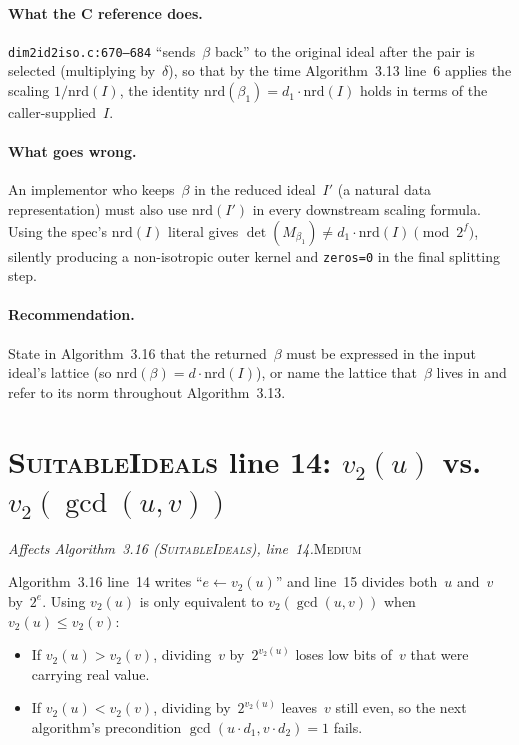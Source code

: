 \documentclass[a4paper,11pt]{article}
\newcommand{\algo}[1]{Algorithm~#1}
\newcommand{\medium}{\textsc{\color{RoyalBlue}Medium}}
\newcommand{\finding}[2]{\noindent\textit{#1}\hfill#2\par\smallskip}
\begin{document}
\paragraph{What the C reference does.}
\texttt{dim2id2iso.c:670--684} ``sends~$\beta$ back'' to the
original ideal after the pair is selected (multiplying
by~$\delta$), so that by the time \algo{3.13} line~6 applies the
scaling $1/\mathrm{nrd}(I)$, the identity
$\mathrm{nrd}(\beta_1) = d_1 \cdot \mathrm{nrd}(I)$ holds in
terms of the caller-supplied~$I$.

\paragraph{What goes wrong.}
An implementor who keeps~$\beta$ in the reduced ideal~$I'$ (a
natural data representation) must also use $\mathrm{nrd}(I')$ in
every downstream scaling formula.  Using the spec's
$\mathrm{nrd}(I)$ literal gives $\det(M_{\beta_1}) \neq d_1 \cdot
\mathrm{nrd}(I) \pmod{2^f}$, silently producing a non-isotropic
outer kernel and \texttt{zeros=0} in the final splitting step.

\paragraph{Recommendation.}
State in \algo{3.16} that the returned~$\beta$ must be expressed
in the input ideal's lattice (so $\mathrm{nrd}(\beta) = d \cdot
\mathrm{nrd}(I)$), or name the lattice that~$\beta$ lives in and
refer to its norm throughout \algo{3.13}.

\section{\textsc{SuitableIdeals} line 14:
  \texorpdfstring{$v_2(u)$}{v2(u)} vs.\
  \texorpdfstring{$v_2(\gcd(u, v))$}{v2(gcd(u,v))}}
\label{sec:suitableideals-e-val}

\finding{Affects \algo{3.16} (\textsc{SuitableIdeals}), line~14.}{\medium}

\algo{3.16} line~14 writes ``$e \leftarrow v_2(u)$'' and line~15
divides both~$u$ and~$v$ by~$2^e$.  Using $v_2(u)$ is only
equivalent to $v_2(\gcd(u, v))$ when $v_2(u) \le v_2(v)$:
\begin{itemize}
  \item If $v_2(u) > v_2(v)$, dividing~$v$ by~$2^{v_2(u)}$ loses
    low bits of~$v$ that were carrying real value.
  \item If $v_2(u) < v_2(v)$, dividing by~$2^{v_2(u)}$ leaves~$v$
    still even, so the next algorithm's precondition
    $\gcd(u \cdot d_1, v \cdot d_2) = 1$ fails.
\end{itemize}
\end{document}
